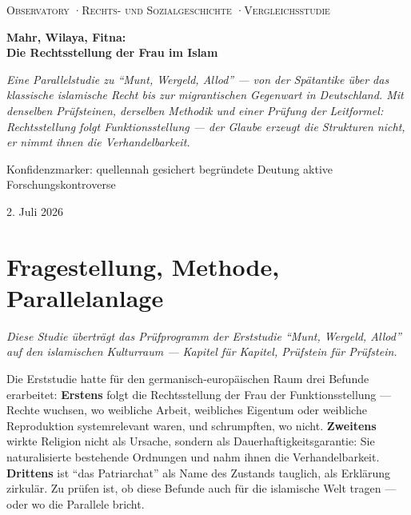 \documentclass[11pt,a4paper,ngerman]{scrartcl}
\newcommand{\chipbase}[2]{\hspace{0pt}{\footnotesize\textcolor{#1}{[\textsc{#2}]}}}
\newcommand{\chipbelegt}[1]{\chipbase{chipgreen}{#1}}
\newcommand{\chipplausibel}[1]{\chipbase{chipamber}{#1}}
\newcommand{\chipumstritten}[1]{\chipbase{chipred}{#1}}
\begin{document}

\begin{titlepage}
\centering
{\footnotesize\scshape Observatory \quad·\quad Rechts- und Sozialgeschichte \quad·\quad Vergleichsstudie\par}
\vspace{2.5cm}
{\Huge\bfseries Mahr, Wilaya, Fitna:\\Die Rechtsstellung der Frau im Islam\par}
\vspace{1.2cm}
{\large\itshape Eine Parallelstudie zu \enquote{Munt, Wergeld, Allod} --- von der Spätantike über das klassische islamische Recht bis zur migrantischen Gegenwart in Deutschland. Mit denselben Prüfsteinen, derselben Methodik und einer Prüfung der Leitformel: Rechtsstellung folgt Funktionsstellung --- der Glaube erzeugt die Strukturen nicht, er nimmt ihnen die Verhandelbarkeit.\par}
\vfill
{\small Konfidenzmarker: \chipbelegt{belegt} quellennah gesichert \quad \chipplausibel{plausibel} begründete Deutung \quad \chipumstritten{umstritten} aktive Forschungskontroverse\par}
\vspace{1cm}
{\large 2. Juli 2026\par}
\end{titlepage}
\tableofcontents
\clearpage

\section{Fragestellung, Methode, Parallelanlage}
\noindent\textit{Diese Studie überträgt das Prüfprogramm der Erststudie \enquote{Munt, Wergeld, Allod} auf den islamischen Kulturraum --- Kapitel für Kapitel, Prüfstein für Prüfstein.}
\medskip

Die Erststudie hatte für den germanisch-europäischen Raum drei Befunde erarbeitet: \textbf{Erstens} folgt die Rechtsstellung der Frau der Funktionsstellung --- Rechte wuchsen, wo weibliche Arbeit, weibliches Eigentum oder weibliche Reproduktion systemrelevant waren, und schrumpften, wo nicht. \textbf{Zweitens} wirkte Religion nicht als Ursache, sondern als Dauerhaftigkeitsgarantie: Sie naturalisierte bestehende Ordnungen und nahm ihnen die Verhandelbarkeit. \textbf{Drittens} ist \enquote{das Patriarchat} als Name des Zustands tauglich, als Erklärung zirkulär. Zu prüfen ist, ob diese Befunde auch für die islamische Welt tragen --- oder wo die Parallele bricht.
\end{document}
